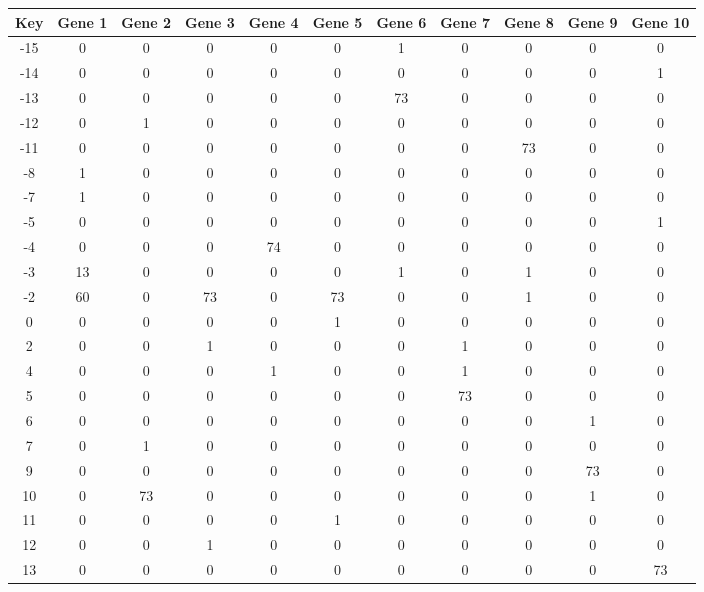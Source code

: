 \begin{tabular}{|c|c|c|c|c|c|c|c|c|c|c|}
\hline
Key & Gene 1 & Gene 2 & Gene 3 & Gene 4 & Gene 5 & Gene 6 & Gene 7 & Gene 8 & Gene 9 & Gene 10 \\
\hline
-15 & 0 & 0 & 0 & 0 & 0 & 1 & 0 & 0 & 0 & 0 \\
-14 & 0 & 0 & 0 & 0 & 0 & 0 & 0 & 0 & 0 & 1 \\
-13 & 0 & 0 & 0 & 0 & 0 & 73 & 0 & 0 & 0 & 0 \\
-12 & 0 & 1 & 0 & 0 & 0 & 0 & 0 & 0 & 0 & 0 \\
-11 & 0 & 0 & 0 & 0 & 0 & 0 & 0 & 73 & 0 & 0 \\
-8 & 1 & 0 & 0 & 0 & 0 & 0 & 0 & 0 & 0 & 0 \\
-7 & 1 & 0 & 0 & 0 & 0 & 0 & 0 & 0 & 0 & 0 \\
-5 & 0 & 0 & 0 & 0 & 0 & 0 & 0 & 0 & 0 & 1 \\
-4 & 0 & 0 & 0 & 74 & 0 & 0 & 0 & 0 & 0 & 0 \\
-3 & 13 & 0 & 0 & 0 & 0 & 1 & 0 & 1 & 0 & 0 \\
-2 & 60 & 0 & 73 & 0 & 73 & 0 & 0 & 1 & 0 & 0 \\
0 & 0 & 0 & 0 & 0 & 1 & 0 & 0 & 0 & 0 & 0 \\
2 & 0 & 0 & 1 & 0 & 0 & 0 & 1 & 0 & 0 & 0 \\
4 & 0 & 0 & 0 & 1 & 0 & 0 & 1 & 0 & 0 & 0 \\
5 & 0 & 0 & 0 & 0 & 0 & 0 & 73 & 0 & 0 & 0 \\
6 & 0 & 0 & 0 & 0 & 0 & 0 & 0 & 0 & 1 & 0 \\
7 & 0 & 1 & 0 & 0 & 0 & 0 & 0 & 0 & 0 & 0 \\
9 & 0 & 0 & 0 & 0 & 0 & 0 & 0 & 0 & 73 & 0 \\
10 & 0 & 73 & 0 & 0 & 0 & 0 & 0 & 0 & 1 & 0 \\
11 & 0 & 0 & 0 & 0 & 1 & 0 & 0 & 0 & 0 & 0 \\
12 & 0 & 0 & 1 & 0 & 0 & 0 & 0 & 0 & 0 & 0 \\
13 & 0 & 0 & 0 & 0 & 0 & 0 & 0 & 0 & 0 & 73 \\
\hline
\end{tabular}